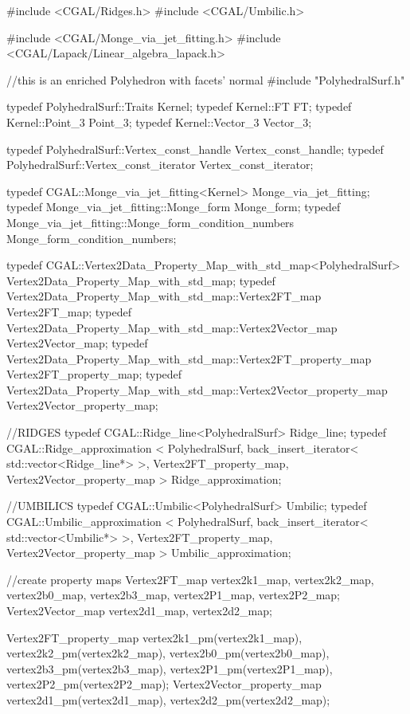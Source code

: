 \begin{ccExampleCode} 
#include <CGAL/Ridges.h> 
#include <CGAL/Umbilic.h>

#include <CGAL/Monge_via_jet_fitting.h> 
#include <CGAL/Lapack/Linear_algebra_lapack.h>
 
//this is an enriched Polyhedron with facets' normal
#include "PolyhedralSurf.h"

typedef PolyhedralSurf::Traits          Kernel;
typedef Kernel::FT                      FT;
typedef Kernel::Point_3                 Point_3;
typedef Kernel::Vector_3                Vector_3;

typedef PolyhedralSurf::Vertex_const_handle   Vertex_const_handle;
typedef PolyhedralSurf::Vertex_const_iterator Vertex_const_iterator;

typedef CGAL::Monge_via_jet_fitting<Kernel>    Monge_via_jet_fitting;
typedef Monge_via_jet_fitting::Monge_form      Monge_form;
typedef Monge_via_jet_fitting::Monge_form_condition_numbers Monge_form_condition_numbers;
      
typedef CGAL::Vertex2Data_Property_Map_with_std_map<PolyhedralSurf> Vertex2Data_Property_Map_with_std_map;
typedef Vertex2Data_Property_Map_with_std_map::Vertex2FT_map Vertex2FT_map;
typedef Vertex2Data_Property_Map_with_std_map::Vertex2Vector_map Vertex2Vector_map;
typedef Vertex2Data_Property_Map_with_std_map::Vertex2FT_property_map Vertex2FT_property_map;
typedef Vertex2Data_Property_Map_with_std_map::Vertex2Vector_property_map Vertex2Vector_property_map;

//RIDGES
typedef CGAL::Ridge_line<PolyhedralSurf> Ridge_line;
typedef CGAL::Ridge_approximation < PolyhedralSurf,
				    back_insert_iterator< std::vector<Ridge_line*> >,
				    Vertex2FT_property_map,
				    Vertex2Vector_property_map > Ridge_approximation;
  

//UMBILICS
typedef CGAL::Umbilic<PolyhedralSurf> Umbilic;
typedef CGAL::Umbilic_approximation < PolyhedralSurf,
				      back_insert_iterator< std::vector<Umbilic*> >, 
				      Vertex2FT_property_map, 
				      Vertex2Vector_property_map > Umbilic_approximation;

//create property maps
Vertex2FT_map vertex2k1_map, vertex2k2_map, 
  vertex2b0_map, vertex2b3_map, 
  vertex2P1_map, vertex2P2_map;
Vertex2Vector_map vertex2d1_map, vertex2d2_map;

Vertex2FT_property_map vertex2k1_pm(vertex2k1_map), vertex2k2_pm(vertex2k2_map), 
  vertex2b0_pm(vertex2b0_map), vertex2b3_pm(vertex2b3_map), 
  vertex2P1_pm(vertex2P1_map), vertex2P2_pm(vertex2P2_map);
Vertex2Vector_property_map vertex2d1_pm(vertex2d1_map), vertex2d2_pm(vertex2d2_map);


\end{ccExampleCode}
